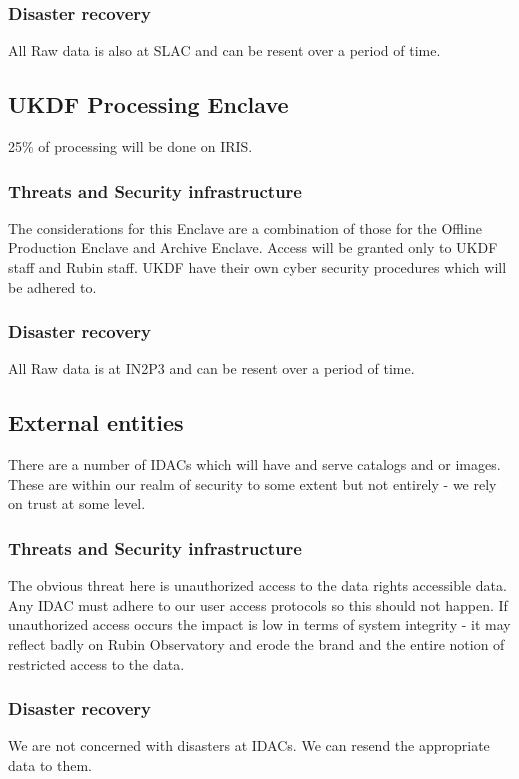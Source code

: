 \subsubsection{Disaster recovery}
All Raw data is also at SLAC and can be resent over a period of time.

\subsection{UKDF Processing  \gls{Enclave}}
25\% of processing will be done on \gls{IRIS}.
\subsubsection{Threats and Security infrastructure}
The considerations for this Enclave are a combination of those for the Offline Production Enclave and Archive Enclave.
Access will be granted only to UKDF staff and Rubin staff.
UKDF have their own cyber security procedures which will be adhered to.
\subsubsection{Disaster recovery}
All Raw data is at IN2P3 and can be resent over a period of time.


\subsection{External entities}
There are a number of \gls{IDAC}s which will have and serve catalogs and or images.
These are within our realm of security to some extent but not entirely - we rely on trust at some level.
\subsubsection{Threats and Security infrastructure}
The obvious threat here is unauthorized access to the data rights accessible data.
Any IDAC must adhere to our user access protocols so this should not happen.
If unauthorized access occurs the impact is low in terms of system integrity - it may reflect badly on Rubin Observatory and erode the brand and the entire notion of restricted access to the data.

\subsubsection{Disaster recovery}
We are not concerned with disasters at IDACs.
We can resend the appropriate data to them.
